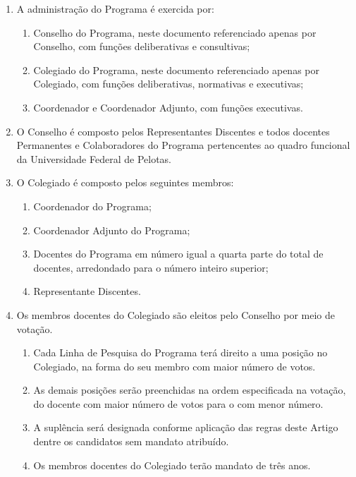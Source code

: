\documentclass{article}
\newcommand{\grupoMenor}{Colegiado\xspace}
\newcommand{\grupoMaior}{Conselho\xspace}
\begin{document}
\begin{enumerate}

	\item A administração do Programa é exercida por:
	\begin{enumerate}[label=\Roman*]	
		\item \grupoMaior do Programa, neste documento referenciado apenas por \grupoMaior, com funções deliberativas e consultivas;
		\item \grupoMenor do Programa, neste documento referenciado apenas por \grupoMenor, com funções deliberativas, normativas e executivas;
		\item Coordenador e Coordenador Adjunto, com funções executivas.
	\end{enumerate}

	\item O \grupoMaior é composto pelos Representantes Discentes e todos docentes Permanentes e Colaboradores do Programa pertencentes ao quadro funcional da Universidade Federal de Pelotas.

	\item O \grupoMenor é composto pelos seguintes membros:
	\begin{enumerate}[label=\Roman*]
		\item Coordenador do Programa;
		\item Coordenador Adjunto do Programa;
		\item Docentes do Programa em número igual a quarta parte do total de docentes, arredondado para o número inteiro superior;
		\item Representante Discentes.
	\end{enumerate}

	\item Os membros docentes do \grupoMenor são eleitos pelo \grupoMaior por meio de votação.
	\begin{enumerate}
		\item Cada Linha de Pesquisa do Programa terá direito a uma posição no \grupoMenor, na forma do seu membro com maior número de votos.
		\item As demais posições serão preenchidas na ordem especificada na votação, do docente com maior número de votos para o com menor número.
		\item A suplência será designada conforme aplicação das regras deste Artigo dentre os candidatos sem mandato atribuído.
		\item Os membros docentes do \grupoMenor terão mandato de três anos.		
	\end{enumerate}


\end{enumerate}
\end{document}
